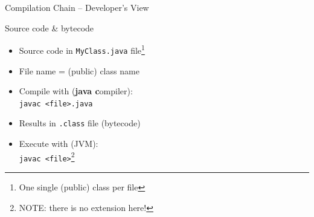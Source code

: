 \documentclass[English,c,%
hyperref={%
    pdftitle={FISA-DE2 OOP in Java},%
    pdfauthor={Muller, Gravier, Laforest, Subercaze},%
    pdfsubject={OOP in Java},%
    pdfkeywords={OOP, Java},%
    colorlinks=true,%
    urlcolor=blue,%
    linkcolor=%
    },%
xcolor={pdftex,svgnames} %
]{beamer}
\begin{document}
\begin{frame}{Compilation Chain -- Developer's View}


\end{frame}

\begin{frame}{Source code \& bytecode}
  \begin{itemize}
    \item Source code in \texttt{MyClass.java} file\footnote{One single (public) class per file}
    \medskip
    \item File name = (public) class name
    \medskip
    \item Compile with (\textbf{java c}ompiler): \\
    \texttt{javac <file>.java}
    \medskip
    \item Results in \texttt{.class} file (bytecode)
    \medskip
    \item Execute with (JVM):\\
    \texttt{javac <file>}\footnote{NOTE: there is no extension here!}
  \end{itemize}
\end{frame}
\end{document}
